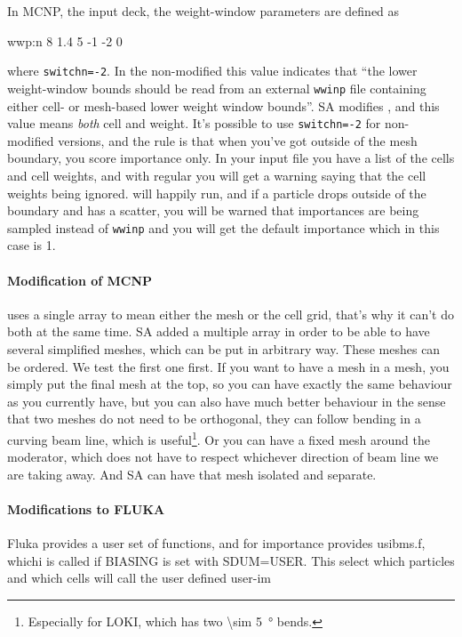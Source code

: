 In MCNP, the input deck, the weight-window parameters are defined as
\begin{deck}
 wwp:n 8 1.4 5 -1 -2 0
\end{deck}
where {\tt switchn=-2}.  In the non-modified \mcnp this value
indicates that ``the lower weight-window bounds should be read from an
external {\tt wwinp} file containing either cell- or mesh-based lower
weight window bounds''.  SA modifies \mcnp, and this value means {\em
  both} cell and weight.  It's possible to use {\tt switchn=-2} for
non-modified \mcnp versions, and the rule is that when you've got
outside of the mesh boundary, you score importance only. In your input
file you have a list of the cells and cell weights, and with regular
\mcnp you will get a warning saying that the cell weights being
ignored.  \mcnp will happily run, and if a particle drops outside of
the boundary and has a scatter, you will be warned that importances
are being sampled instead of {\tt wwinp} 
and you will get the default importance which in this case is 1.

\paragraph{Modification of MCNP}
\mcnp uses a single array to mean either the mesh or the cell grid, that's why it can't do both at the same time.
SA added a multiple array in order to be able to have several simplified meshes, which can be put in arbitrary way.
These meshes can be ordered.
We test the first one first. If you want to have a mesh in a mesh, you simply put the final mesh at the top,
so you can have exactly the same behaviour as you currently have, but you can also have much better behaviour in the sense
that two meshes do not need to be orthogonal, they can follow bending in a curving beam line, which is useful\footnote{Especially for LOKI, which has two \SI{\sim 5}{\degree} bends.}.
Or you can have a fixed mesh around the moderator, which does not have to respect whichever direction of beam line we are taking away.
And SA can have that mesh isolated and separate.

\paragraph{Modifications to FLUKA}

Fluka provides a user set of functions, and for importance provides usibms.f,
whichi is called if BIASING is set with SDUM=USER. This select which particles
and which cells will call the user defined user-im

